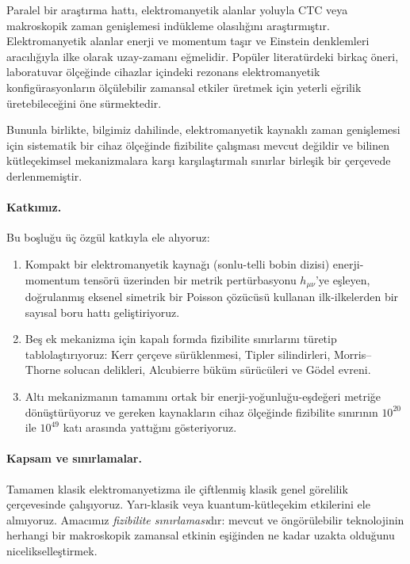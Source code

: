 \documentclass[11pt,a4paper,twocolumn]{article}
\begin{document}
Paralel bir araştırma hattı, elektromanyetik alanlar yoluyla CTC
veya makroskopik zaman genişlemesi indükleme olasılığını
araştırmıştır. Elektromanyetik alanlar enerji ve momentum taşır ve
Einstein denklemleri aracılığıyla ilke olarak uzay-zamanı
eğmelidir. Popüler literatürdeki birkaç öneri, laboratuvar ölçeğinde
cihazlar içindeki rezonans elektromanyetik konfigürasyonların
ölçülebilir zamansal etkiler üretmek için yeterli eğrilik
üretebileceğini öne sürmektedir.

Bununla birlikte, bilgimiz dahilinde, elektromanyetik kaynaklı zaman
genişlemesi için sistematik bir cihaz ölçeğinde fizibilite çalışması
mevcut değildir ve bilinen kütleçekimsel mekanizmalara karşı
karşılaştırmalı sınırlar birleşik bir çerçevede derlenmemiştir.

\paragraph{Katkımız.} Bu boşluğu üç özgül katkıyla ele alıyoruz:

\begin{enumerate}
\item Kompakt bir elektromanyetik kaynağı (sonlu-telli bobin dizisi)
      enerji-momentum tensörü üzerinden bir metrik pertürbasyonu
      $h_{\mu\nu}$'ye eşleyen, doğrulanmış eksenel simetrik bir
      Poisson çözücüsü kullanan ilk-ilkelerden bir sayısal boru hattı
      geliştiriyoruz.
\item Beş ek mekanizma için kapalı formda fizibilite sınırlarını
      türetip tablolaştırıyoruz: Kerr çerçeve sürüklenmesi, Tipler
      silindirleri, Morris--Thorne solucan delikleri, Alcubierre
      büküm sürücüleri ve Gödel evreni.
\item Altı mekanizmanın tamamını ortak bir enerji-yoğunluğu-eşdeğeri
      metriğe dönüştürüyoruz ve gereken kaynakların cihaz ölçeğinde
      fizibilite sınırının $10^{20}$ ile $10^{49}$ katı arasında
      yattığını gösteriyoruz.
\end{enumerate}

\paragraph{Kapsam ve sınırlamalar.} Tamamen klasik elektromanyetizma
ile çiftlenmiş klasik genel görelilik çerçevesinde çalışıyoruz.
Yarı-klasik veya kuantum-kütleçekim etkilerini ele almıyoruz.
Amacımız \emph{fizibilite sınırlaması}dır: mevcut ve öngörülebilir
teknolojinin herhangi bir makroskopik zamansal etkinin eşiğinden ne
kadar uzakta olduğunu nicelikselleştirmek.
\end{document}
